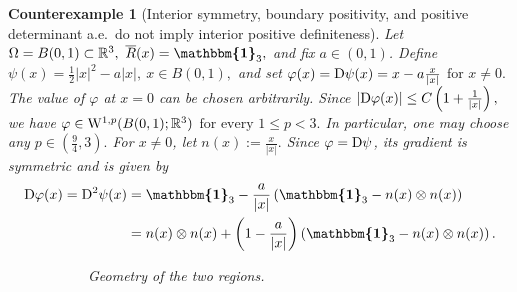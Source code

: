 \documentclass[11pt]{article}
\newcommand{\id}{{\boldsymbol{\mathbbm{1}}}}
\newtheorem{counterexample}[theorem]{Counterexample}
\newcommand{\R}{\mathbb{R}}
\def\aval{0.55}
\def\aval{0.55}
\begin{document}
\begin{counterexample}
[Interior symmetry, boundary positivity, and positive determinant a.e.\ do not imply interior positive definiteness]

Let
$
\Omega=B(0,1)\subset\mathbb R^3,
\ 
 \overline R (x)=\id_3,
$
and fix $a\in(0,1)$. Define
$
\psi(x)
=
\frac{1}{2}|x|^2-a|x|,
\ 
x\in B(0,1),
$
and set
$
\varphi(x)
=
{\rm D}\psi(x)
=
x-a\frac{x}{|x|}
$  $
\text{for }x\neq 0.
$
The value of $\varphi$ at $x=0$ can be chosen arbitrarily. Since
$
|{\rm D}\varphi(x)|
\leq
C\left(1+\frac{1}{|x|}\right),
$
we have
$
\varphi\in {\rm W}^{1,p}(B(0,1);\mathbb R^3)
$  $
\text{for every }1\leq p<3.$
In particular, one may choose any
$
p\in\left(\frac{9}{4},3\right).
$
For $x\neq 0$, let
$
n(x):=\frac{x}{|x|}.
$
Since $\varphi={\rm D}\psi$, its gradient is symmetric and is given by
\begin{align}
\begin{aligned}
{\rm D}\varphi(x)
=
{\rm D}^2\psi(x)
&=
\id_3
-
\frac{a}{|x|}
\left(
\id_3-n(x)\otimes n(x)
\right)
\\
&=
n(x)\otimes n(x)
+
\left(
1-\frac{a}{|x|}
\right)
\left(
\id_3-n(x)\otimes n(x)
\right).
\end{aligned}
\end{align}
\begin{figure}[t]
\centering

\begin{subfigure}[t]{0.32\textwidth}
\centering
\vspace{0pt}
\caption{Geometry of the two regions.}
\label{fig:counterexample-geom}
\end{subfigure}
\hfill
\begin{subfigure}[t]{0.33\textwidth}
\centering
\vspace{0pt}


\end{subfigure}
\end{figure}
\end{counterexample}
\end{document}
